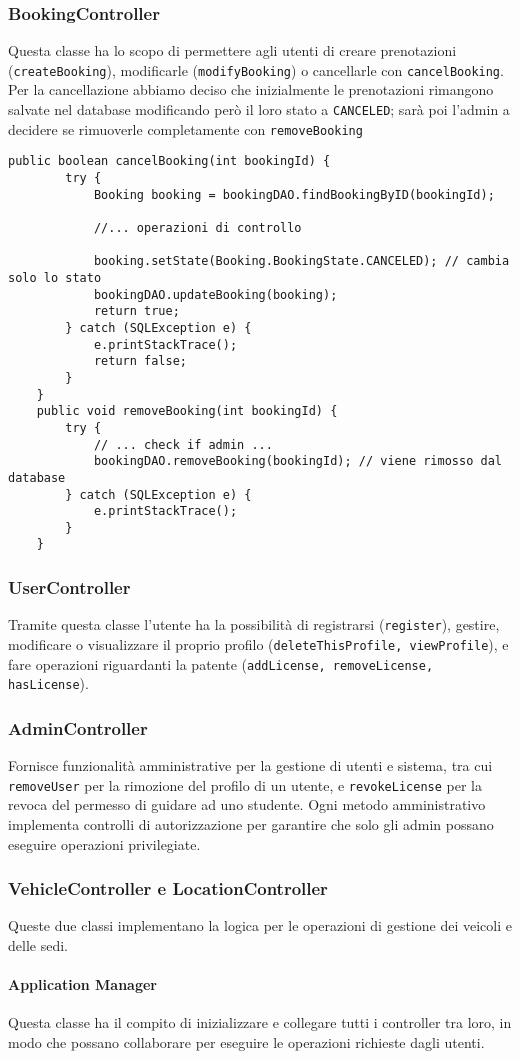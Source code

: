 \subsubsection{BookingController}
Questa classe ha lo scopo di permettere agli utenti di creare prenotazioni (\texttt{createBooking}), modificarle (\texttt{modifyBooking}) o cancellarle con \texttt{cancelBooking}. Per la cancellazione abbiamo deciso che inizialmente le prenotazioni rimangono salvate nel database modificando però il loro stato a \texttt{CANCELED}; sarà poi l'admin a decidere se rimuoverle completamente con \texttt{removeBooking}
\begin{lstlisting}[style=Java, caption={Cancellazione e rimozione di una Prenotazione in \texttt{BookingController}}]
    public boolean cancelBooking(int bookingId) {
        try {
            Booking booking = bookingDAO.findBookingByID(bookingId);
            
            //... operazioni di controllo

            booking.setState(Booking.BookingState.CANCELED); // cambia solo lo stato
            bookingDAO.updateBooking(booking); 
            return true;
        } catch (SQLException e) {
            e.printStackTrace();
            return false;
        }
    }
    public void removeBooking(int bookingId) {
        try {
            // ... check if admin ...
            bookingDAO.removeBooking(bookingId); // viene rimosso dal database
        } catch (SQLException e) {
            e.printStackTrace();
        }
    }
\end{lstlisting}
\subsubsection{UserController}
Tramite questa classe l'utente ha la possibilità di registrarsi (\texttt{register}), gestire, modificare o visualizzare il proprio profilo (\texttt{deleteThisProfile, viewProfile}), e fare operazioni riguardanti la patente (\texttt{addLicense, removeLicense, hasLicense}).
\subsubsection{AdminController}
Fornisce funzionalità amministrative per la gestione di utenti e sistema, tra cui \texttt{removeUser} per la rimozione del profilo di un utente, e \texttt{revokeLicense} per la revoca del permesso di guidare ad uno studente.
Ogni metodo amministrativo implementa controlli di autorizzazione per garantire che solo gli admin possano eseguire operazioni privilegiate.
\subsubsection{VehicleController e LocationController}
Queste due classi implementano la logica per le operazioni di gestione dei veicoli e delle sedi.

\paragraph{Application Manager}
Questa classe ha il compito di inizializzare e collegare tutti i controller tra loro, in modo che possano collaborare per eseguire le operazioni richieste dagli utenti.